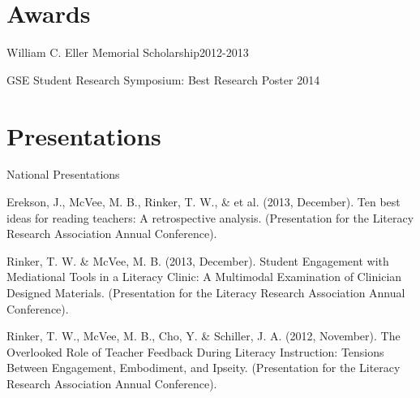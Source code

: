 \section{Awards}
\begin{innerlist}
    \item William C. Eller Memorial Scholarship\hfill 2012-2013
    \item GSE Student Research Symposium: Best Research Poster \hfill 2014
\end{innerlist}

\halfblankline

\section{Presentations}
National Presentations
\begin{innerlist}

\item Erekson, J., McVee, M. B., Rinker, T. W., \& et al. (2013, December). Ten best ideas for reading teachers: A retrospective analysis. (Presentation for the Literacy Research Association Annual Conference).

\item Rinker, T. W. \& McVee, M. B. (2013, December).  Student Engagement with Mediational Tools in a Literacy Clinic: A Multimodal Examination of Clinician Designed Materials.  (Presentation for the Literacy Research Association Annual Conference).

\item Rinker, T. W., McVee, M. B., Cho, Y. \& Schiller, J. A. (2012, November).  The Overlooked Role of Teacher Feedback During Literacy Instruction: Tensions Between Engagement, Embodiment, and Ipseity.  (Presentation for the Literacy Research Association Annual Conference).

\end{innerlist}




\halfblankline

